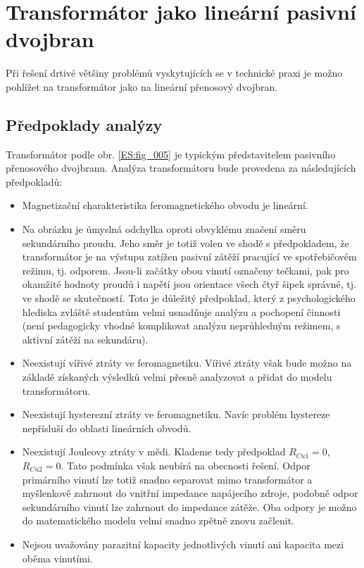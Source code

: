   \section{Transformátor jako lineární pasivní dvojbran}
    Při řešení drtivé většiny problémů vyskytujících se v technické praxi je možno pohlížet na
    transformátor jako na lineární přenosový dvojbran.  
    \subsection{Předpoklady analýzy}
      Transformátor podle obr. \ref{ES:fig_005} je typickým představitelem  pasivního 
      přenosového dvojbranu. Analýza transformátoru bude provedena za následujících předpokladů:
      \begin{itemize}[noitemsep]
        \item Magnetizační charakteristika feromagnetického obvodu je lineární.
        \item Na obrázku je úmyslná odchylka oproti obvyklému značení směru sekundárního proudu.  
              Jeho směr je totiž volen ve shodě s předpokladem, že transformátor je na výstupu 
              zatížen pasivní zátěží pracující ve spotřebičovém režimu, tj. odporem. Jsou-li 
              začátky obou vinutí označeny tečkami, pak pro okamžité hodnoty proudů i napětí jsou 
              orientace všech čtyř šipek správné, tj. ve shodě se skutečností. Toto je důležitý 
              předpoklad, který z psychologického hlediska zvláště studentům velmi usnadňuje 
              analýzu a pochopení činnosti (není pedagogicky vhodné komplikovat analýzu 
              neprůhledným režimem, s aktivní zátěží na sekundáru).
        \item Neexistují vířivé ztráty ve feromagnetiku. Vířivé ztráty však bude možno na základě
              získaných výsledků velmi přesně analyzovat a přidat do modelu transformátoru.
        \item Neexistují hysterezní ztráty ve feromagnetiku. Navíc problém hystereze nepřísluší do
              oblasti lineárních obvodů.
        \item Neexistují Jouleovy ztráty v mědi. Klademe tedy předpoklad \(R_{Cu1} = 0\), \(R_{Cu2}
              = 0\). Tato podmínka však neubírá na obecnosti řešení. Odpor primárního vinutí lze 
              totiž snadno separovat mimo transformátor a myšlenkově zahrnout do vnitřní impedance 
              napájecího zdroje, podobně odpor sekundárního vinutí lze zahrnout do impedance 
              zátěže. Oba odpory je možno do matematického modelu velmi snadno zpětně znovu 
              začlenit.
        \item Nejsou uvažovány parazitní kapacity jednotlivých vinutí ani kapacita mezi oběma vinutími.
      \end{itemize}
      
